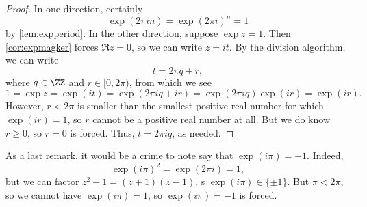 \begin{proof}
	In one direction, certainly
	\[\exp(2\pi in)=\exp(2\pi i)^n=1\]
	by \autoref{lem:expperiod}. In the other direction, suppose $\exp z=1$. Then \autoref{cor:expmagker} forces $\Re z=0$, so we can write $z=it$. By the division algorithm, we can write
	\[t=2\pi q+r,\]
	where $q\in\ZZ$ and $r\in[0,2\pi)$, from which we see
	\[1=\exp z=\exp(it)=\exp(2\pi i q+ir)=\exp(2\pi iq)\exp(ir)=\exp(ir).\]
	However, $r<2\pi$ is smaller than the smallest positive real number for which $\exp(ir)=1$, so $r$ cannot be a positive real number at all. But we do know $r\ge0$, so $r=0$ is forced. Thus, $t=2\pi iq$, as needed.
\end{proof}
\begin{remark}[Nir] \label{rem:eipi}
	As a last remark, it would be a crime to note say that $\exp(i\pi)=-1$. Indeed,
	\[\exp(i\pi)^2=\exp(2\pi i)=1,\]
	but we can factor $z^2-1=(z+1)(z-1)$, s $\exp(i\pi)\in\{\pm1\}$. But $\pi<2\pi$, so we cannot have $\exp(i\pi)=1$, so $\exp(i\pi)=-1$ is forced.
\end{remark}

